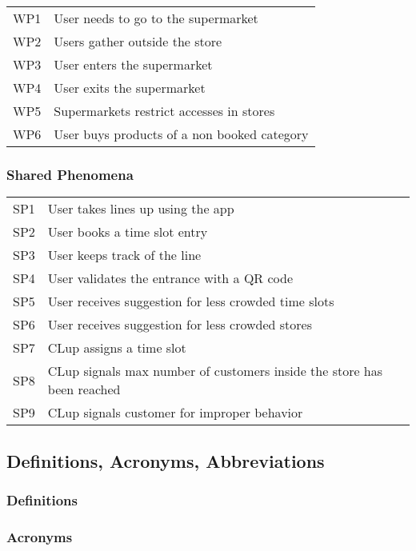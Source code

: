 \begin{tabular}{l|l}
	WP1 & User needs to go to the supermarket\\
	WP2 & Users gather outside the store\\
	WP3 & User enters the supermarket\\
	WP4 & User exits the supermarket\\
	WP5 & Supermarkets restrict accesses in stores\\ %
	WP6 & User buys products of a non booked category\\
\end{tabular}

\subsubsection{Shared Phenomena}
\begin{tabular}{l|l}
	SP1 & User takes lines up using the app\\
	SP2 & User books a time slot entry\\
	SP3 & User keeps track of the line\\
	SP4 & User validates the entrance with a QR code\\
	SP5 & User receives suggestion for less crowded time slots\\
	SP6 & User receives suggestion for less crowded stores\\
	SP7 & CLup assigns a time slot \\
	SP8 & CLup signals max number of customers inside the store has been reached \\
	SP9 & CLup signals customer for improper behavior\\
	
\end{tabular}

\subsection{Definitions, Acronyms, Abbreviations}

\subsubsection{Definitions}

\subsubsection{Acronyms}

